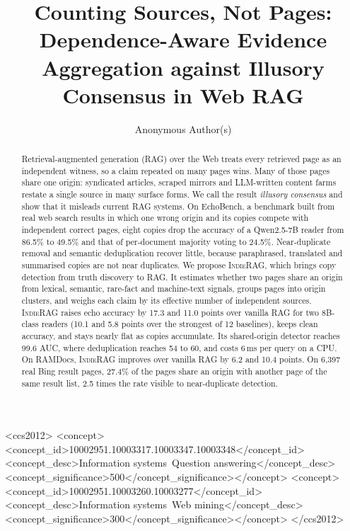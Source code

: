 \documentclass[sigconf,review,anonymous]{acmart}
\newcommand{\sys}{\textsc{IndieRAG}}
\begin{document}
\title{Counting Sources, Not Pages: Dependence-Aware Evidence Aggregation against Illusory Consensus in Web RAG}

\author{Anonymous Author(s)}

\begin{abstract}
Retrieval-augmented generation (RAG) over the Web treats every retrieved page as an independent witness, so a claim
repeated on many pages wins. Many of those pages share one origin: syndicated articles, scraped mirrors and
LLM-written content farms restate a single source in many surface forms. We call the result \emph{illusory consensus}
and show that it misleads current RAG systems. On EchoBench, a benchmark built from real web search results in which
one wrong origin and its copies compete with independent correct pages, eight copies drop the accuracy of a
Qwen2.5-7B reader from 86.5\% to 49.5\% and that of per-document majority voting to 24.5\%. Near-duplicate removal
and semantic deduplication recover little, because paraphrased, translated and summarised copies are not near
duplicates. We propose \sys{}, which brings copy detection from truth discovery to RAG. It estimates whether two
pages share an origin from lexical, semantic, rare-fact and machine-text signals, groups pages into origin clusters,
and weighs each claim by its effective number of independent sources. \sys{} raises echo accuracy by 17.3 and 11.0
points over vanilla RAG for two 8B-class readers (10.1 and 5.8 points over the strongest of 12 baselines), keeps
clean accuracy, and stays nearly flat as copies accumulate. Its shared-origin detector reaches 99.6 AUC, where
deduplication reaches 54 to 60, and costs 6\,ms per query on a CPU. On RAMDocs, \sys{} improves over vanilla RAG
by 6.2 and 10.4 points. On 6{,}397 real Bing result pages, 27.4\% of the pages share an origin with another page of
the same result list, 2.5 times the rate visible to near-duplicate detection.
\end{abstract}

\begin{CCSXML}
<ccs2012>
<concept><concept_id>10002951.10003317.10003347.10003348</concept_id>
<concept_desc>Information systems~Question answering</concept_desc><concept_significance>500</concept_significance></concept>
<concept><concept_id>10002951.10003260.10003277</concept_id>
<concept_desc>Information systems~Web mining</concept_desc><concept_significance>300</concept_significance></concept>
</ccs2012>
\end{CCSXML}
\end{document}
